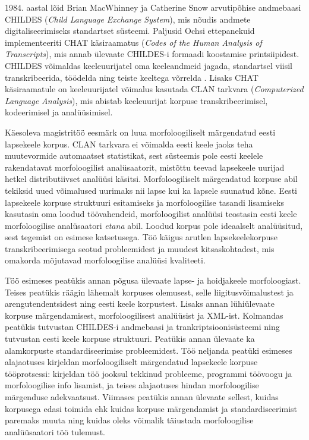 \documentclass[12pt]{article}
\begin{document}
1984. aastal lõid Brian MacWhinney ja Catherine Snow arvutipõhise andmebaasi CHILDES (\emph{Child Language Exchange System}), mis nõudis andmete digitaliseerimiseks standartset süsteemi. Paljusid Ochsi ettepanekuid implementeeriti CHAT käsiraamatus (\emph{Codes of the Human Analysis of Transcripts}), mis annab ülevaate CHILDES-i formaadi koostamise printsiipidest. CHILDES võimaldas keeleuurijatel oma keeleandmeid jagada, standartsel viisil transkribeerida, töödelda ning teiste keeltega võrrelda \citep{SnowMacWhinney}. Lisaks CHAT käsiraamatule on keeleuurijatel võimalus kasutada CLAN tarkvara (\emph{Computerized Language Analysis}), mis abistab keeleuurijat korpuse transkribeerimisel, kodeerimisel ja analüüsimisel.

Käesoleva magistritöö eesmärk on luua morfoloogiliselt märgendatud eesti lapsekeele korpus. CLAN tarkvara ei võimalda eesti keele jaoks teha muutevormide automaatset statistikat, sest süsteemis pole eesti keelele rakendatavat morfoloogilist analüsaatorit, mistõttu teevad lapsekeele uurijad hetkel distributiivset analüüsi käsitsi. Morfoloogiliselt märgendatud korpuse abil tekiksid uued võimalused uurimaks nii lapse kui ka lapsele suunatud kõne. Eesti lapsekeele korpuse struktuuri esitamiseks ja morfoloogilise tasandi lisamiseks kasutasin oma loodud töövahendeid, morfoloogilist analüüsi teostasin eesti keele morfoloogilise analüsaatori \emph{etana} abil. Loodud korpus pole ideaalselt analüüsitud, sest tegemist on esimese katsetusega. Töö käigus arutlen lapsekeelekorpuse transkribeerimisega seotud probleemidest ja muudest kitsaskohtadest, mis omakorda mõjutavad morfoloogilise analüüsi kvaliteeti.

Töö esimeses peatükis annan põgusa ülevaate lapse- ja hoidjakeele morfoloogiast. Teises peatükis räägin lähemalt korpuses olemusest, selle liigitusvõimalustest ja arengutendentsidest ning eesti keele korpustest. Lisaks annan lühiülevaate korpuse märgendamisest, morfoloogilisest analüüsist ja XML-ist. Kolmandas peatükis tutvustan CHILDES-i andmebaasi ja trankriptsioonisüsteemi ning tutvustan eesti keele korpuse struktuuri. Peatükis annan ülevaate ka alamkorpuste standardiseerimise probleemidest. Töö neljanda peatüki esimeses alajaotuses kirjeldan morfoloogiliselt märgendatud lapsekeele korpuse tööprotsessi: kirjeldan töö jooksul tekkinud probleeme, programmi töövoogu ja morfoloogilise info lisamist, ja teises alajaotuses hindan morfoloogilise märgenduse adekvaatsust. Viimases peatükis annan ülevaate sellest, kuidas korpusega edasi toimida ehk kuidas korpuse märgendamist ja standardiseerimist paremaks muuta ning kuidas oleks võimalik täiustada morfoloogilise analüüsaatori töö tulemust.
\end{document}
